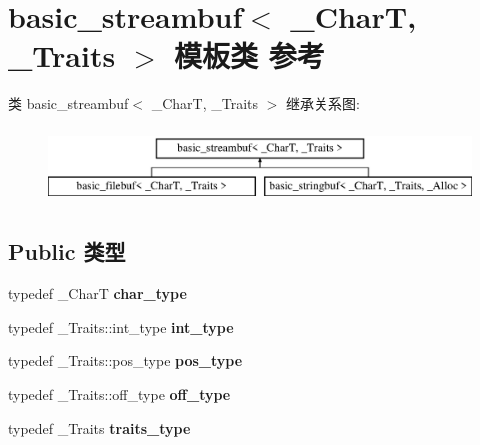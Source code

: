 \hypertarget{classbasic__streambuf}{}\section{basic\+\_\+streambuf$<$ \+\_\+\+CharT, \+\_\+\+Traits $>$ 模板类 参考}
\label{classbasic__streambuf}
类 basic\+\_\+streambuf$<$ \+\_\+\+CharT, \+\_\+\+Traits $>$ 继承关系图\+:\begin{figure}[H]
\begin{center}
\leavevmode
\includegraphics[height=2.000000cm]{classbasic__streambuf}
\end{center}
\end{figure}
\subsection*{Public 类型}
\begin{DoxyCompactItemize}
\item 
\mbox{\label{classbasic__streambuf_a10b43892a7668294d4ea4fceb31ee60c}} 
typedef \+\_\+\+CharT {\bfseries char\+\_\+type}
\item 
\mbox{\label{classbasic__streambuf_addaa1803211cc560c894192298529a3d}} 
typedef \+\_\+\+Traits\+::int\+\_\+type {\bfseries int\+\_\+type}
\item 
\mbox{\label{classbasic__streambuf_ad43e615d3f580f7a37a56a27efbaad63}} 
typedef \+\_\+\+Traits\+::pos\+\_\+type {\bfseries pos\+\_\+type}
\item 
\mbox{\label{classbasic__streambuf_aaf8cb054032871a37952dce3902704fb}} 
typedef \+\_\+\+Traits\+::off\+\_\+type {\bfseries off\+\_\+type}
\item 
\mbox{\label{classbasic__streambuf_a60d8b8bb7d2290147e369cfb5d4e3712}} 
typedef \+\_\+\+Traits {\bfseries traits\+\_\+type}
\end{DoxyCompactItemize}
